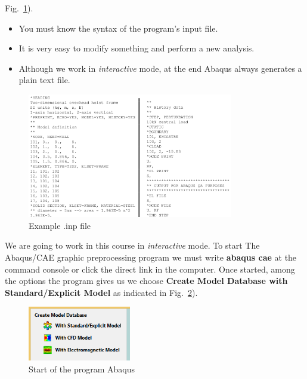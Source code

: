 \begin{enumerate}
  Fig.~\ref{figu09}).
  \begin{itemize}
  \item You must know the syntax of the program's input file.
  \item It is very easy to modify something and perform a new
    analysis.
  \item Although we work in \textit{interactive} mode, at the end
    Abaqus always generates a plain text file.
  \end{itemize}
  \begin{figure}[!h]
    \begin{center}
      \includegraphics[width=0.8\textwidth]{./body/images/imagen09}
    \end{center}
    \caption{Example .inp file}
    \label{figu09}
  \end{figure}
\end{enumerate}

We are going to work in this course in \textit{interactive} mode. To start The
Abaqus/CAE graphic preprocessing program we must write \textbf{abaqus
  cae} at the command console or click the direct link in the
computer.  Once started, among the options the program gives us we
choose \textbf{Create Model Database with Standard/Explicit Model} as
indicated in Fig.~\ref{figu00}).
\begin{figure}[!h]
  \begin{center}
    \includegraphics[width=0.4\textwidth]{./body/images/imagen00}
  \end{center}
  \caption{Start of the program Abaqus}
  \label{figu00}
\end{figure}

